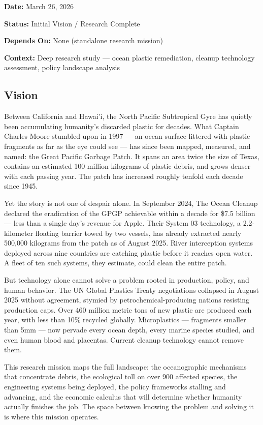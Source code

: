 \documentclass[11pt,letterpaper]{article}
\newcommand{\metafield}[2]{\textbf{\sffamily #1} #2\par}
\begin{document}
\metafield{Date:}{March 26, 2026}
\metafield{Status:}{Initial Vision / Research Complete}
\metafield{Depends On:}{None (standalone research mission)}
\metafield{Context:}{Deep research study --- ocean plastic remediation, cleanup technology assessment, policy landscape analysis}

\subsection{Vision}

Between California and Hawai'i, the North Pacific Subtropical Gyre has quietly been accumulating humanity's discarded plastic for decades. What Captain Charles Moore stumbled upon in 1997 --- an ocean surface littered with plastic fragments as far as the eye could see --- has since been mapped, measured, and named: the Great Pacific Garbage Patch. It spans an area twice the size of Texas, contains an estimated 100 million kilograms of plastic debris, and grows denser with each passing year. The patch has increased roughly tenfold each decade since 1945.

Yet the story is not one of despair alone. In September 2024, The Ocean Cleanup declared the eradication of the GPGP achievable within a decade for \$7.5 billion --- less than a single day's revenue for Apple. Their System 03 technology, a 2.2-kilometer floating barrier towed by two vessels, has already extracted nearly 500,000 kilograms from the patch as of August 2025. River interception systems deployed across nine countries are catching plastic before it reaches open water. A fleet of ten such systems, they estimate, could clean the entire patch.

But technology alone cannot solve a problem rooted in production, policy, and human behavior. The UN Global Plastics Treaty negotiations collapsed in August 2025 without agreement, stymied by petrochemical-producing nations resisting production caps. Over 460 million metric tons of new plastic are produced each year, with less than 10\% recycled globally. Microplastics --- fragments smaller than 5mm --- now pervade every ocean depth, every marine species studied, and even human blood and placentas. Current cleanup technology cannot remove them.

This research mission maps the full landscape: the oceanographic mechanisms that concentrate debris, the ecological toll on over 900 affected species, the engineering systems being deployed, the policy frameworks stalling and advancing, and the economic calculus that will determine whether humanity actually finishes the job. The space between knowing the problem and solving it is where this mission operates.
\end{document}
